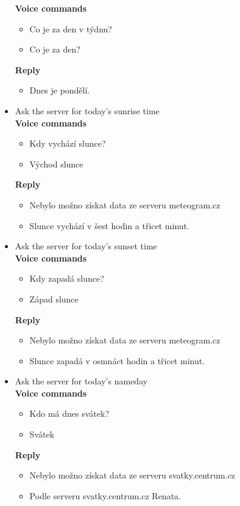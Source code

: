 \begin{itemize}
    \textbf{Voice commands}
    \begin{itemize}
        \item Co je za den v týdnu?
        \item Co je za den?
    \end{itemize}
    \textbf{Reply}
    \begin{itemize}
        \item Dnes je pondělí.
    \end{itemize}
    \item Ask the server for today's sunrise time\\
    \textbf{Voice commands}
    \begin{itemize}
        \item Kdy vychází slunce?
        \item Východ slunce
    \end{itemize}
    \textbf{Reply}
    \begin{itemize}
        \item Nebylo možno získat data ze serveru meteogram.cz
        \item Slunce vychází v šest hodin a třicet minut.
    \end{itemize}
    \item Ask the server for today's sunset time\\
    \textbf{Voice commands}
    \begin{itemize}
        \item Kdy zapadá slunce?
        \item Západ slunce
    \end{itemize}
    \textbf{Reply}
    \begin{itemize}
        \item Nebylo možno získat data ze serveru meteogram.cz
        \item Slunce zapadá v osmnáct hodin a třicet minut.
    \end{itemize}
    \item Ask the server for today's nameday\\
    \textbf{Voice commands}
    \begin{itemize}
        \item Kdo má dnes svátek?
        \item Svátek
    \end{itemize}
    \textbf{Reply}
    \begin{itemize}
        \item Nebylo možno získat data ze serveru svatky.centrum.cz
        \item Podle serveru svatky.centrum.cz Renata.
    \end{itemize}
\end{itemize}

